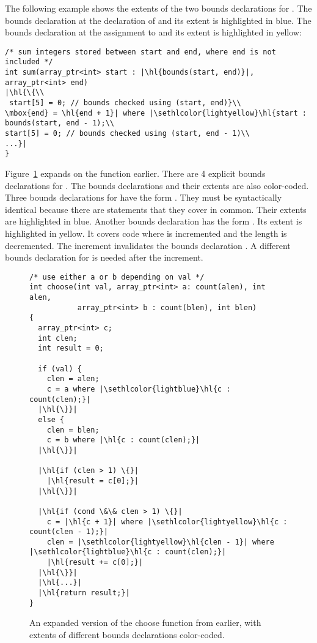 The following example shows the extents of the two bounds declarations for
.  The bounds declaration at the declaration of  and
its extent is highlighted in blue. The bounds declaration at the assignment
to  and its extent is highlighted in yellow:

\begin{lstlisting}[escapechar=\|]
/* sum integers stored between start and end, where end is not included */
int sum(array_ptr<int> start : |\hl{bounds(start, end)}|, array_ptr<int> end)
|\hl{\{\\
 start[5] = 0; // bounds checked using (start, end)}\\
\mbox{end} = \hl{end + 1}| where |\sethlcolor{lightyellow}\hl{start : bounds(start, end - 1);\\
start[5] = 0; // bounds checked using (start, end - 1)\\
...}|
}
\end{lstlisting}

Figure~\ref{fig:bounds-extent:choose} expands on the  function earlier.
There are 4 explicit bounds declarations for . The bounds declarations
and their extents are also color-coded. Three bounds declarations for 
have the form . They must be syntactically
identical because there are statements that they cover in common. Their
extents are highlighted in blue.  Another bounds declaration has
the form .   Its extent is highlighted
in yellow. It covers code where  is incremented and the
length is decremented.  The increment invalidates the bounds declaration
.  A different bounds declaration for 
is needed after the increment.

\begin{figure}
\begin{lstlisting}[escapechar=\|]
/* use either a or b depending on val */
int choose(int val, array_ptr<int> a: count(alen), int alen,
           array_ptr<int> b : count(blen), int blen)
{
  array_ptr<int> c;
  int clen;
  int result = 0;

  if (val) {
    clen = alen;
    c = a where |\sethlcolor{lightblue}\hl{c : count(clen);}|
  |\hl{\}}|
  else {
    clen = blen;
    c = b where |\hl{c : count(clen);}|
  |\hl{\}}|

  |\hl{if (clen > 1) \{}|
    |\hl{result = c[0];}|
  |\hl{\}}|

  |\hl{if (cond \&\& clen > 1) \{}|
    c = |\hl{c + 1}| where |\sethlcolor{lightyellow}\hl{c : count(clen - 1);}|
    clen = |\sethlcolor{lightyellow}\hl{clen - 1}| where |\sethlcolor{lightblue}\hl{c : count(clen);}|
    |\hl{result += c[0];}|
  |\hl{\}}|
  |\hl{...}|
  |\hl{return result;}|
}
\end{lstlisting}
\caption{An expanded version of the choose function from earlier, with extents of different bounds declarations color-coded.}
\label{fig:bounds-extent:choose}
\end{figure}

